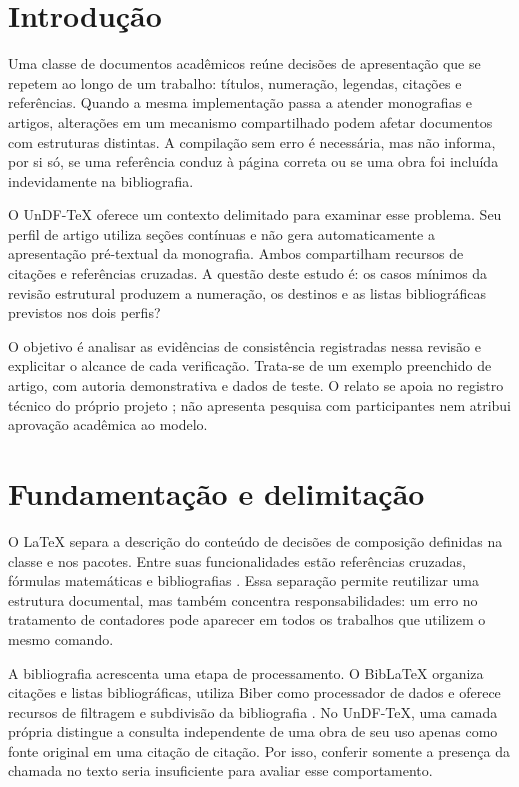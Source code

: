 \section{Introdução}

Uma classe de documentos acadêmicos reúne decisões de apresentação que se
repetem ao longo de um trabalho: títulos, numeração, legendas, citações e
referências. Quando a mesma implementação passa a atender monografias e
artigos, alterações em um mecanismo compartilhado podem afetar documentos
com estruturas distintas. A compilação sem erro é necessária, mas não informa,
por si só, se uma referência conduz à página correta ou se uma obra foi
incluída indevidamente na bibliografia.

O UnDF-TeX oferece um contexto delimitado para examinar esse problema. Seu
perfil de artigo utiliza seções contínuas e não gera automaticamente a
apresentação pré-textual da monografia. Ambos compartilham recursos de
citações e referências cruzadas. A questão deste estudo é: os casos mínimos
da revisão estrutural produzem a numeração, os destinos e as listas
bibliográficas previstos nos dois perfis?

O objetivo é analisar as evidências de consistência registradas nessa revisão
e explicitar o alcance de cada verificação. Trata-se de um exemplo preenchido
de artigo, com autoria demonstrativa e dados de teste. O relato se apoia no
registro técnico do próprio projeto ; não apresenta
pesquisa com participantes nem atribui aprovação acadêmica ao modelo.

\section{Fundamentação e delimitação}

O LaTeX separa a descrição do conteúdo de decisões de composição definidas na
classe e nos pacotes. Entre suas funcionalidades estão referências cruzadas,
fórmulas matemáticas e bibliografias . Essa separação
permite reutilizar uma estrutura documental, mas também concentra
responsabilidades: um erro no tratamento de contadores pode aparecer em
todos os trabalhos que utilizem o mesmo comando.

A bibliografia acrescenta uma etapa de processamento. O BibLaTeX organiza
citações e listas bibliográficas, utiliza Biber como processador de dados e
oferece recursos de filtragem e subdivisão da bibliografia
. No UnDF-TeX, uma camada própria distingue a consulta
independente de uma obra de seu uso apenas como fonte original em uma citação
de citação. Por isso, conferir somente a presença da chamada no texto seria
insuficiente para avaliar esse comportamento.

